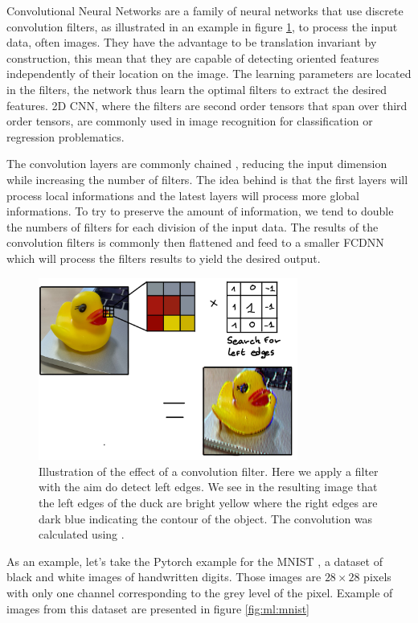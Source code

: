 \documentclass[../main.tex]{subfiles}
\begin{document}
Convolutional Neural Networks are a family of neural networks that use discrete convolution filters, as illustrated in an example in figure \ref{fig:ml:conv_filter}, to process the input data, often images. They have the advantage to be translation invariant by construction, this mean that they are capable of detecting oriented features independently of their location on the image. The learning parameters are located in the filters, the network thus learn the optimal filters to extract the desired features. 2D CNN, where the filters are second order tensors that span over third order tensors, are commonly used in image recognition \cite{russakovsky_imagenet_2015} for classification or regression problematics.

The convolution layers are commonly chained \cite{simonyan_very_2015}, reducing the input dimension while increasing the number of filters. The idea behind is that the first layers will process local informations and the latest layers will process more global informations. To try to preserve the amount of information, we tend to double the numbers of filters for each division of the input data.
The results of the convolution filters is commonly then flattened and feed to a smaller FCDNN which will process the filters results to yield the desired output.

\begin{figure}[ht]
  \centering
  \includegraphics[height=6cm]{images/ml/convolution_exammple.jpg}
  \caption{Illustration of the effect of a convolution filter. Here we apply a filter with the aim do detect left edges. We see in the resulting image that the left edges of the duck are bright yellow where the right edges are dark blue indicating the contour of the object. The convolution was calculated using \cite{allen_generic-github-userimage-convolution-playground_2024}.}
  \label{fig:ml:conv_filter}
\end{figure}

As an example, let's take the Pytorch \cite{ansel_pytorch_2024} example for the MNIST \cite{lecun_gradient-based_1998}, a dataset of black and white images of handwritten digits. Those images are $28 \times 28$ pixels with only one channel corresponding to the grey level of the pixel. Example of images from this dataset are presented in figure \ref{fig:ml:mnist}
\end{document}
